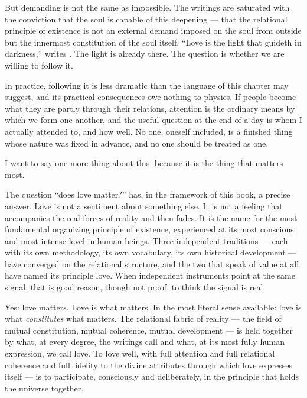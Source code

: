 But demanding is not the same as impossible.  The \bahai writings are saturated
with the conviction that the soul is capable of this deepening --- that the
relational principle of existence is not an external demand imposed on the soul
from outside but the innermost constitution of the soul itself.  ``Love is the
light that guideth in darkness,'' \AbdulBaha writes \citep[\S 12]{SelectionsAbdul}.  The
light is already there.  The question is whether we are willing to follow it.

In practice, following it is less dramatic than the language of this chapter
may suggest, and its practical consequences owe nothing to physics.  If people
become what they are partly through their relations, attention is the ordinary
means by which we form one another, and the useful question at the end of a
day is whom I actually attended to, and how well.  No one, oneself included,
is a finished thing whose nature was fixed in advance, and no one should be
treated as one.

I want to say one more thing about this, because it is the thing that matters most.

The question ``does love matter?'' has, in the framework of this book, a precise
answer.  Love is not a sentiment about something else.  It is not a feeling that
accompanies the real forces of reality and then fades.  It is the name for the
most fundamental organizing principle of existence, experienced at its most
conscious and most intense level in human beings.  Three independent traditions
--- each with its own methodology, its own vocabulary, its own historical
development --- have converged on the relational structure, and the two that
speak of value at all have named its principle love.  When independent
instruments point at the same signal, that is good reason, though not proof,
to think the signal is real.

Yes: love matters.  Love is what matters.  In the most literal sense available:
love is what \emph{constitutes} what matters.  The relational fabric of reality ---
the field of mutual constitution, mutual coherence, mutual development --- is
held together by what, at every degree, the \bahai writings call \mahabbat and
what, at its most fully human expression, we call love.  To love well, with full
attention and full relational coherence and full fidelity to the divine attributes
through which love expresses itself --- is to participate, consciously and
deliberately, in the principle that holds the universe together.

